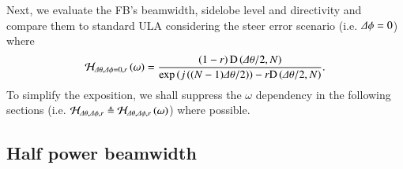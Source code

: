 Next, we evaluate the FB's beamwidth, sidelobe level and directivity and compare them to standard ULA considering the steer error scenario (i.e. $\Delta\phi=0$) where 
\begin{equation}\label{eq_Hdphi0}
\Hr_{\dTheta,\dPhi=0,r}\rBrace{\omega}=
             \frac{\rBrace{1-r}\D{\dTheta/2}{N}}{\exp\rBrace{j\rBrace{(N-1)\dTheta/2}}-r\D{\dTheta/2}{N}}.
\end{equation}
To simplify the exposition, we shall suppress the $\omega$ dependency in the following sections (i.e. $\mathcal{H}_{\Delta\theta,\Delta\phi,r} \triangleq \mathcal{H}_{\Delta\theta,\Delta\phi,r}\left({\omega}\right)$) where possible.

\subsection*{Half power beamwidth}

